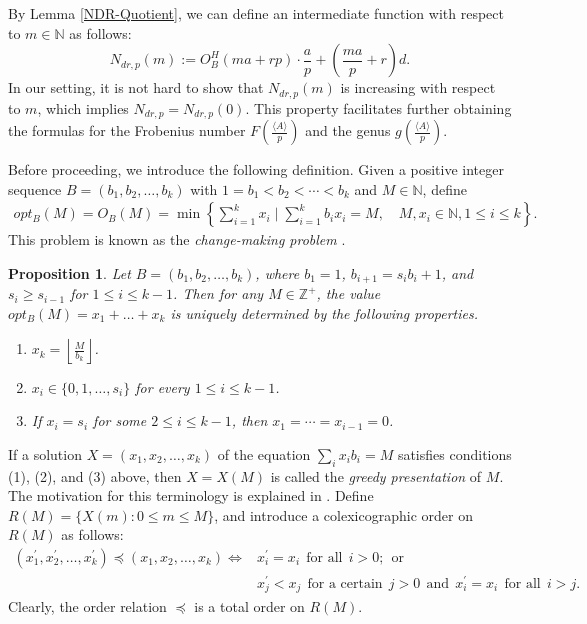 \documentclass[reqno, 12pt]{article}
\newtheorem{prop}[thm]{Proposition}
\theoremstyle{mydefinition}
\theoremstyle{myremark}
\numberwithin{algorithm}{section}
\begin{document}
By Lemma \ref{NDR-Quotient}, we can define an intermediate function with respect to $m\in \mathbb{N}$ as follows:
$$N_{dr,p}(m):=O_{B}^{H}(ma+rp) \cdot \frac{a}{p}+\left(\frac{ma}{p}+r\right)d.$$
In our setting, it is not hard to show that $N_{dr,p}(m)$ is increasing with respect to $m$, which implies $N_{dr,p}=N_{dr,p}(0)$. This property facilitates further obtaining the formulas for the Frobenius number $F\left(\frac{\langle A\rangle}{p}\right)$ and the genus $g\left(\frac{\langle A\rangle}{p}\right)$.


Before proceeding, we introduce the following definition.  
Given a positive integer sequence  $B = (b_1, b_2, \ldots, b_k)$ with $1 = b_1 < b_2 < \cdots < b_k$ and $M \in \mathbb{N}$, define
\begin{align*}
opt_B(M)=O_B(M)=\min\left\{\sum_{i=1}^kx_i \mid \sum_{i=1}^kb_ix_i=M, \quad M,x_i\in \mathbb{N}, 1\leq i\leq k\right\}.
\end{align*}
This problem is known as the \emph{change-making problem} \cite{AnnAdamaszek}.

\begin{prop}{\em \cite[Lemma 2.6 and Proposition 2.7]{LiuSemigroupF}}\label{greedproper}
Let $B=\left(b_1,b_2,\ldots,b_k\right)$, where $b_1=1$, $b_{i+1}=s_ib_i+1$, and $s_i\geq s_{i-1}$ for $1\leq i\leq k-1$.
Then for any $M\in \mathbb{Z}^{+}$, the value $opt_B(M)=x_1+\dots+ x_k$ is uniquely determined by the following properties.
\begin{enumerate}
  \item[(1)] $x_k=\left\lfloor \frac{M}{b_k}\right\rfloor$.

  \item[(2)] $x_i\in \{0,1,\ldots,s_i\}$ for every $1\leq i\leq k-1$.

  \item[(3)] If $x_i=s_i$ for some $2\leq i\leq k-1$, then $x_1=\cdots =x_{i-1}=0$.
\end{enumerate}
\end{prop}

If a solution $X=(x_1,x_2,\ldots,x_k)$ of the equation $\sum_i x_ib_i=M$ satisfies conditions (1), (2), and (3) above, then $X=X(M)$ is called the \emph{greedy presentation} of $M$. The motivation for this terminology is explained in \cite{LiuSemigroupF}.
Define $R(M)=\{X(m): 0\leq m \leq M\}$, and introduce a colexicographic order on $R(M)$ as follows:
\begin{align*}
(x_1^{\prime},x_2^{\prime},\ldots,x_k^{\prime})\preceq (x_1,x_2,\ldots,x_k)
\Longleftrightarrow & x_i^{\prime}=x_i\ \ \text{for all}\ \ i>0;\ \ \text{or}
\\& x_j^{\prime}<x_j\ \ \text{for a certain}\ \ j>0\ \ \text{and}\ \ x_i^{\prime}=x_i\ \ \text{for all}\ \ i>j.
\end{align*}
Clearly, the order relation $\preceq$ is a total order on $R(M)$.
\end{document}
